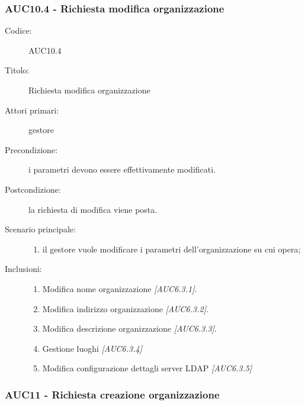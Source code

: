 \documentclass[casi-duso]{subfiles}
\begin{document}
\subsubsection{AUC10.4 - Richiesta modifica organizzazione}%
\label{subsub:AUC10.4}
\begin{description}
  \item[Codice:] AUC10.4
  \item[Titolo:] Richiesta modifica organizzazione
  \item[Attori primari:] gestore
  \item[Precondizione:] i parametri devono essere effettivamente modificati.
  \item[Postcondizione:] la richiesta di modifica viene posta.
  \item[Scenario principale:]
  \begin{enumerate}
    \item il gestore vuole modificare i parametri dell'organizzazione su cui opera;
  \end{enumerate}
  \item[Inclusioni:]
  \begin{enumerate}
    \item Modifica nome organizzazione \emph{[AUC6.3.1]}.
    \item Modifica indirizzo organizzazione \emph{[AUC6.3.2]}.
    \item Modifica descrizione organizzazione \emph{[AUC6.3.3]}.
    \item Gestione luoghi \emph{[AUC6.3.4]}
    \item Modifica configurazione dettagli server LDAP \emph{[AUC6.3.5]}
  \end{enumerate}
\end{description}

\subsubsection{AUC11 - Richiesta creazione organizzazione}%
\label{subsub:AUC11}
\end{document}
